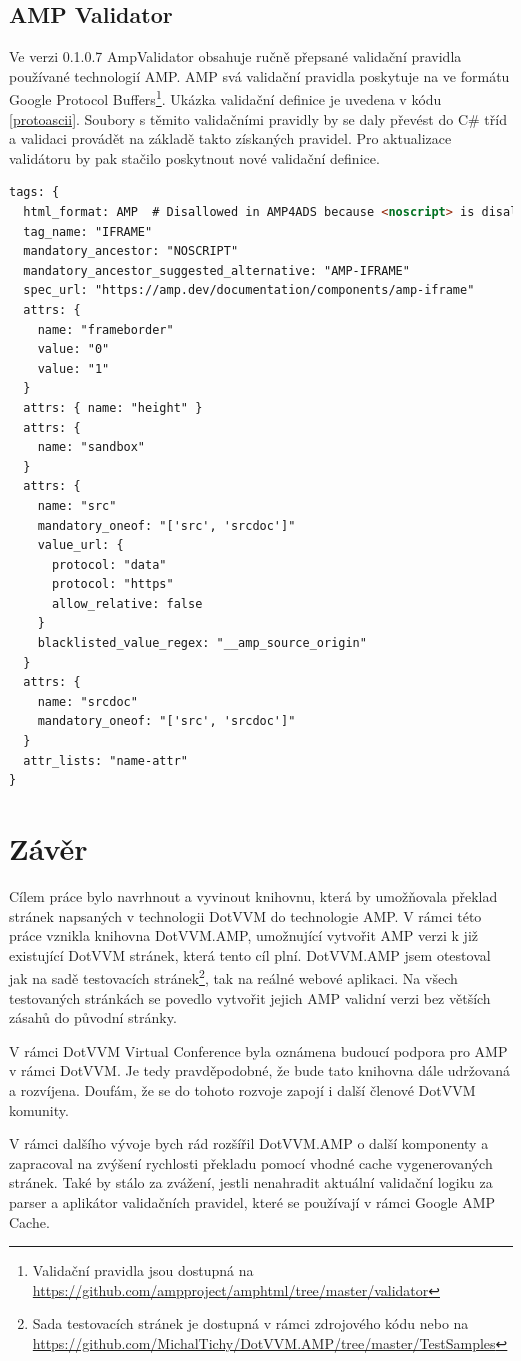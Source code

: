 \section{AMP Validator}
Ve verzi 0.1.0.7 AmpValidator obsahuje ručně přepsané validační pravidla používané technologií AMP. AMP svá validační pravidla poskytuje na ve formátu Google Protocol Buffers\footnote{Validační pravidla jsou dostupná na \url{https://github.com/ampproject/amphtml/tree/master/validator}}. Ukázka validační definice je uvedena v kódu \ref{protoascii}\cite{validatorGit}.  Soubory s těmito validačními pravidly by se daly převést do C\# tříd a validaci provádět na základě takto získaných pravidel. Pro aktualizace validátoru by pak stačilo poskytnout nové validační definice.

\begin{lstlisting}[language=html, caption=Ukázka části validačního pravidla pro iframe v rámci protoascii souboru.,label=protoascii,captionpos=t]
tags: {
  html_format: AMP  # Disallowed in AMP4ADS because <noscript> is disallowed.
  tag_name: "IFRAME"
  mandatory_ancestor: "NOSCRIPT"
  mandatory_ancestor_suggested_alternative: "AMP-IFRAME"
  spec_url: "https://amp.dev/documentation/components/amp-iframe"
  attrs: {
    name: "frameborder"
    value: "0"
    value: "1"
  }
  attrs: { name: "height" }
  attrs: {
    name: "sandbox"
  }
  attrs: {
    name: "src"
    mandatory_oneof: "['src', 'srcdoc']"
    value_url: {
      protocol: "data"
      protocol: "https"
      allow_relative: false
    }
    blacklisted_value_regex: "__amp_source_origin"
  }
  attrs: {
    name: "srcdoc"
    mandatory_oneof: "['src', 'srcdoc']"
  }
  attr_lists: "name-attr"
}
\end{lstlisting}

\chapter{Závěr}
Cílem práce bylo navrhnout a vyvinout knihovnu, která by umožňovala překlad stránek napsaných v technologii DotVVM do technologie AMP. V rámci této práce vznikla knihovna DotVVM.AMP, umožnující vytvořit AMP verzi k již existující DotVVM stránek, která tento cíl plní. DotVVM.AMP jsem otestoval jak na sadě testovacích stránek\footnote{ Sada testovacích stránek je dostupná v rámci zdrojového kódu nebo na \url{https://github.com/MichalTichy/DotVVM.AMP/tree/master/TestSamples}}, tak na reálné webové aplikaci. Na všech testovaných stránkách se povedlo vytvořit jejich AMP validní verzi bez větších zásahů do původní stránky.

V rámci DotVVM Virtual Conference byla oznámena budoucí podpora pro AMP v rámci DotVVM. Je tedy pravděpodobné, že bude tato knihovna dále udržovaná a rozvíjena\cite{herceg_2020}.  Doufám, že se do tohoto rozvoje zapojí i další členové DotVVM komunity.

V rámci dalšího vývoje bych rád rozšířil DotVVM.AMP o další komponenty a zapracoval na zvýšení rychlosti překladu pomocí vhodné cache vygenerovaných stránek. Také by stálo za zvážení, jestli nenahradit aktuální validační logiku za parser a aplikátor validačních pravidel, které se používají v rámci Google AMP Cache.